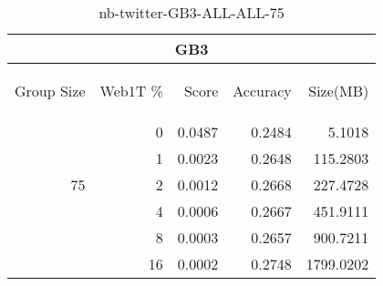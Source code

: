 \begin{center}
\begin{table}[htbp]
\begin{tabular}{ | r | r | r | r | r |}
\hline
\multicolumn{5}{|c|}{GB3}\\
\hline
\begin{sideways}Group Size\end{sideways} & \begin{sideways}Web1T \%\end{sideways} & \begin{sideways}Score\end{sideways} & \begin{sideways}Accuracy\end{sideways} & \begin{sideways}Size(MB)\end{sideways}\\
\hline
\multirow{5}{*}{75}
 & 0 & 0.0487 & 0.2484 & 5.1018\\ \cline{2-5}
 & 1 & 0.0023 & 0.2648 & 115.2803\\ \cline{2-5}
 & 2 & 0.0012 & 0.2668 & 227.4728\\ \cline{2-5}
 & 4 & 0.0006 & 0.2667 & 451.9111\\ \cline{2-5}
 & 8 & 0.0003 & 0.2657 & 900.7211\\ \cline{2-5}
 & 16 & 0.0002 & 0.2748 & 1799.0202\\ \cline{2-5}
\hline
\end{tabular}
\caption{nb-twitter-GB3-ALL-ALL-75}
\label{table:nb-twitter-GB3-ALL-ALL-75}
\end{table}
\end{center}


